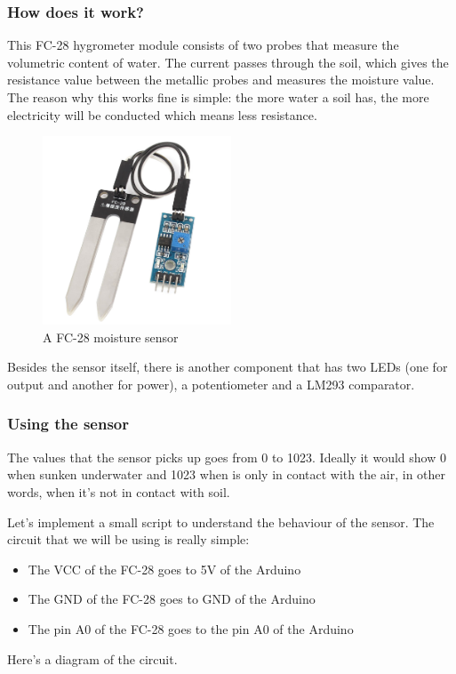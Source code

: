 \subsubsection{How does it work?}
This FC-28 hygrometer module consists of two probes that measure the volumetric content of water. The current passes through the soil, which gives the resistance value between the metallic probes and measures the moisture value. The reason why this works fine is simple: the more water a soil has, the more electricity will be conducted which means less resistance.

\begin{figure}[H]
    \centering
    \includegraphics[width=0.5\textwidth]{fig/fc28.jpg}
    \caption{A FC-28 moisture sensor}
    \label{fig:fc28}
\end{figure}

Besides the sensor itself, there is another component that has two LEDs (one for output and another for power), a potentiometer and a LM293\cite{lm293datasheet} comparator.

\subsubsection{Using the sensor}
The values that the sensor picks up goes from 0 to 1023. Ideally it would show 0 when sunken underwater and 1023 when is only in contact with the air, in other words, when it's not in contact with soil.

Let's implement a small script to understand the behaviour of the sensor. The circuit that we will be using is really simple:
\begin{itemize}
	\item The VCC of the FC-28 goes to 5V of the Arduino
	\item The GND of the FC-28 goes to GND of the Arduino
	\item The pin A0 of the FC-28 goes to the pin A0 of the Arduino
\end{itemize}
Here's a diagram of the circuit.

